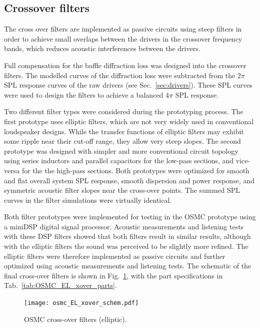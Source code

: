 \documentclass[12pt,a4paper]{article}
\providecommand{\figr}[1]{Fig.~\ref{fig:#1}}
\providecommand{\figlabel}[1]{\label{fig:#1}}
\providecommand{\tabl}[1]{Tab.~\ref{tab:#1}}
\providecommand{\sectn}[1]{Sec.~\ref{sec:#1}}
\providecommand{\seclabel}[1]{\label{sec:#1}}
\begin{document}
\subsection{Crossover filters}\seclabel{crossover_filters}

The cross over filters are implemented as passive circuits using steep filters in order to achieve small overlaps between the drivers in the crossover frequency bands, which reduces acoustic interferences between the drivers.

Full compensation for the baffle diffraction loss was designed into the crossover filters. The modelled curves of the diffraction loss were subtracted from the $2\pi$ SPL response curves of the raw drivers (see \sectn{drivers}). These SPL curves were used to design the filters to achieve a balanced $4\pi$ SPL response.\par

Two different filter types were considered during the prototyping process.\cite{osmc_p685} The first prototype uses elliptic filters, which are not very widely used in conventional loudspeaker designs. While the transfer functions of elliptic filters may exhibit some ripple near their cut-off range, they allow very steep slopes. The second prototype was designed with simpler and more conventional circuit topology using series inductors and parallel capacitors for the low-pass sections, and vice-versa for the the high-pass sections. Both prototypes were optimized for smooth and flat overall system SPL response, smooth dispersion and power response, and symmetric acoustic filter slopes near the cross-over points. The summed SPL curves in the filter simulations were virtually identical.

Both filter prototypes were implemented for testing in the OSMC prototype using a miniDSP digital signal processor. Acoustic measurements and listening tests with these DSP filters showed that both filters result in similar results, although with the elliptic filters the sound was perceived to be slightly more refined.\cite{osmc_p708} The elliptic filters were therefore implemented as passive circuits and further optimized using acoustic measurements and listening tests. The schematic of the final cross-over filters is shown in \figr{osmc_EL_xover_schem}, with the part specifications in \tabl{OSMC_EL_xover_parts}.

\begin{figure}[p]
	\centering
	\texttt{[image: osmc\_EL\_xover\_schem.pdf]}
	\caption{OSMC cross-over filters (elliptic).}
	\figlabel{osmc_EL_xover_schem}
\end{figure}
\end{document}
